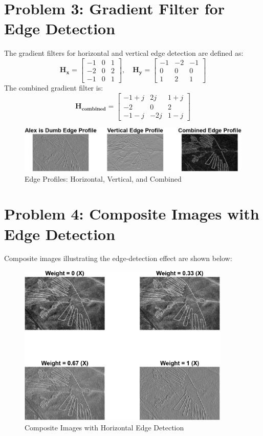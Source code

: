\documentclass[12pt]{article}
\begin{document}
\newpage
\section*{Problem 3: Gradient Filter for Edge Detection}
The gradient filters for horizontal and vertical edge detection are defined as:
\[
\bm{H_x} = \begin{bmatrix}
-1 & 0 & 1 \\
-2 & 0 & 2 \\
-1 & 0 & 1
\end{bmatrix}, \quad
\bm{H_y} = \begin{bmatrix}
-1 & -2 & -1 \\
0 & 0 & 0 \\
1 & 2 & 1
\end{bmatrix}
\]
The combined gradient filter is:
\[
\bm{H_{combined}} = \begin{bmatrix}
-1 + j & 2j & 1 + j \\
-2 & 0 & 2 \\
-1 - j & -2j & 1 - j
\end{bmatrix}
\]

\vspace{1cm}
\begin{figure}[H]
    \centering
    \includegraphics[width=1\textwidth]{edge_profiles.png}
    \caption{Edge Profiles: Horizontal, Vertical, and Combined}
\end{figure}


\newpage
\section*{Problem 4: Composite Images with Edge Detection}
Composite images illustrating the edge-detection effect are shown below:

\begin{figure}[H]
    \centering
    \includegraphics[width=0.9\textwidth]{horizontal_edge_composites.png}
    \caption{Composite Images with Horizontal Edge Detection}
\end{figure}
\end{document}
